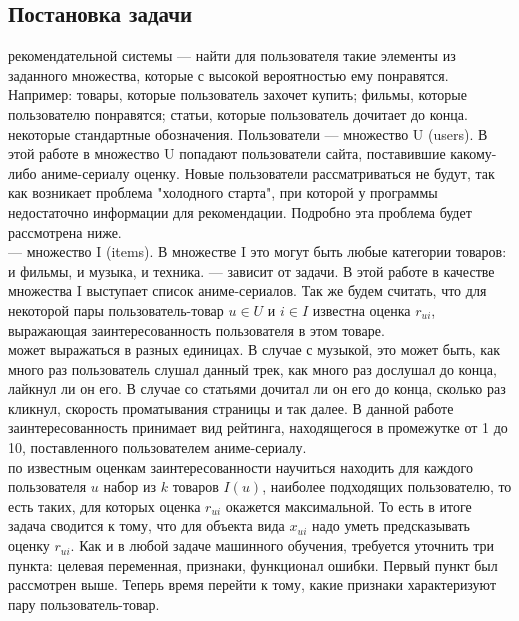 \documentclass{article}
\newcommand\tab[1][1cm]{\hspace*{#1}}
\begin{document}
\subsection*{Постановка задачи\vspace{5mm}}

 рекомендательной системы — найти для пользователя такие элементы из заданного множества, которые с высокой вероятностью ему понравятся. Например: товары, которые пользователь захочет купить; фильмы, которые пользователю понравятся; статьи, которые пользователь дочитает до конца.\\
 некоторые стандартные обозначения. Пользователи — множество ﻿U (users). В этой работе в множество ﻿U попадают пользователи сайта, поставившие какому-либо аниме-сериалу оценку. Новые пользователи рассматриваться не будут, так как возникает проблема "холодного старта", при которой у программы недостаточно информации для рекомендации. Подробно эта проблема будет рассмотрена ниже.\\
 — множество ﻿I﻿ (items). В множестве I это могут быть любые категории товаров: и фильмы, и музыка, и техника. — зависит от задачи. В этой работе в качестве множества I выступает список аниме-сериалов. Так же будем считать, что для некоторой пары пользователь-товар ﻿$u\in U$ и $i\in I$﻿﻿ известна оценка $r_{ui}$, выражающая заинтересованность пользователя в этом товаре.\\
 может выражаться в разных единицах. В случае с музыкой, это может быть, как много раз пользователь слушал данный трек, как много раз дослушал до конца, лайкнул ли он его. В случае со статьями дочитал ли он его до конца, сколько раз кликнул, скорость проматывания страницы и так далее. В данной работе заинтересованность принимает вид рейтинга, находящегося в промежутке от 1 до 10, поставленного пользователем аниме-сериалу. \\
 по известным оценкам заинтересованности научиться находить для каждого пользователя $u$ набор из ﻿$k$ товаров ﻿$I(u)$, наиболее подходящих пользователю, то есть таких, для которых оценка ﻿$r_{ui}$ окажется максимальной. То есть в итоге задача сводится к тому, что для объекта вида ﻿$x_{ui}$ надо уметь предсказывать оценку $r_{ui}$. Как и в любой задаче машинного обучения, требуется уточнить три пункта: целевая переменная, признаки, функционал ошибки. Первый пункт был рассмотрен выше. Теперь время перейти к тому, какие признаки характеризуют пару пользователь-товар.

\newpage
\end{document}
